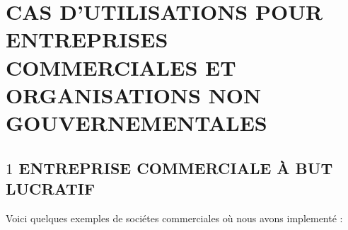 \chapter{CAS D'UTILISATIONS POUR ENTREPRISES COMMERCIALES ET ORGANISATIONS NON GOUVERNEMENTALES}

\vspace{-2em}


\vspace{1em}

\section{$1$ ENTREPRISE COMMERCIALE \`A BUT LUCRATIF}

Voici quelques exemples de soci\'etes commerciales
o\`u nous avons implement\'e \yerotherpblack:


